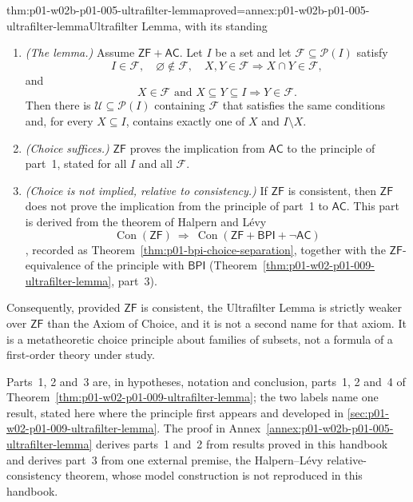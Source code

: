 \begin{hbtheorem}{thm:p01-w02b-p01-005-ultrafilter-lemma}{proved=annex:p01-w02b-p01-005-ultrafilter-lemma}{Ultrafilter Lemma, with its standing}
\begin{enumerate}
  \item \emph{(The lemma.)} Assume \(\mathsf{ZF}+\mathsf{AC}\). Let \(I\) be
    a set and let \(\mathcal F\subseteq\mathcal P(I)\) satisfy
    \[
      I\in\mathcal F,\quad\varnothing\notin\mathcal F,\quad
      X,Y\in\mathcal F\Rightarrow X\cap Y\in\mathcal F,
    \]
    and
    \[
      X\in\mathcal F\text{ and }X\subseteq Y\subseteq I
      \Rightarrow Y\in\mathcal F.
    \]
    Then there is \(\mathcal U\subseteq\mathcal P(I)\) containing
    \(\mathcal F\) that satisfies the same conditions and, for every
    \(X\subseteq I\), contains exactly one of \(X\) and \(I\setminus X\).
  \item \emph{(Choice suffices.)} \(\mathsf{ZF}\) proves the implication from
    \(\mathsf{AC}\) to the principle of part~1, stated for all \(I\) and all
    \(\mathcal F\).
  \item \emph{(Choice is not implied, relative to consistency.)} If
    \(\mathsf{ZF}\) is consistent, then \(\mathsf{ZF}\) does not prove the
    implication from the principle of part~1 to \(\mathsf{AC}\). This part is
    derived from the theorem of Halpern and L\'evy
    \[
      \operatorname{Con}(\mathsf{ZF})\ \Longrightarrow\
      \operatorname{Con}(\mathsf{ZF}+\mathsf{BPI}+\neg\mathsf{AC})
    \]
    \cite{HalpernLevy1971}, recorded as
    Theorem~\ref{thm:p01-bpi-choice-separation}, together with the
    \(\mathsf{ZF}\)-equivalence of the principle with \(\mathsf{BPI}\)
    (Theorem~\ref{thm:p01-w02-p01-009-ultrafilter-lemma}, part~3).
\end{enumerate}
Consequently, provided \(\mathsf{ZF}\) is consistent, the Ultrafilter Lemma is
strictly weaker over \(\mathsf{ZF}\) than the Axiom of Choice, and it is not a
second name for that axiom. It is a metatheoretic choice principle about
families of subsets, not a formula of a first-order theory under study.
\end{hbtheorem}

Parts~1, 2 and~3 are, in hypotheses, notation and conclusion, parts~1, 2
and~4 of Theorem~\ref{thm:p01-w02-p01-009-ultrafilter-lemma}; the two labels
name one result, stated here where the principle first appears and developed
in \cref{sec:p01-w02-p01-009-ultrafilter-lemma}. The proof in
Annex~\ref{annex:p01-w02b-p01-005-ultrafilter-lemma} derives parts~1 and~2
from results proved in this handbook and derives part~3 from one external
premise, the Halpern--L\'evy relative-consistency theorem, whose model
construction is not reproduced in this handbook.

